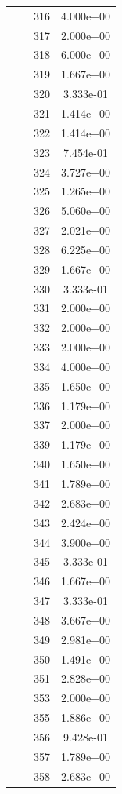 \documentclass[12pt]{article}
\begin{document}
\begin{longtable}{@{}cccc@{}}
 &  & 316 & 4.000e+00 \\
 &  & 317 & 2.000e+00 \\
 &  & 318 & 6.000e+00 \\
 &  & 319 & 1.667e+00 \\
 &  & 320 & 3.333e-01 \\
 &  & 321 & 1.414e+00 \\
 &  & 322 & 1.414e+00 \\
 &  & 323 & 7.454e-01 \\
 &  & 324 & 3.727e+00 \\
 &  & 325 & 1.265e+00 \\
 &  & 326 & 5.060e+00 \\
 &  & 327 & 2.021e+00 \\
 &  & 328 & 6.225e+00 \\
 &  & 329 & 1.667e+00 \\
 &  & 330 & 3.333e-01 \\
 &  & 331 & 2.000e+00 \\
 &  & 332 & 2.000e+00 \\
 &  & 333 & 2.000e+00 \\
 &  & 334 & 4.000e+00 \\
 &  & 335 & 1.650e+00 \\
 &  & 336 & 1.179e+00 \\
 &  & 337 & 2.000e+00 \\
 &  & 339 & 1.179e+00 \\
 &  & 340 & 1.650e+00 \\
 &  & 341 & 1.789e+00 \\
 &  & 342 & 2.683e+00 \\
 &  & 343 & 2.424e+00 \\
 &  & 344 & 3.900e+00 \\
 &  & 345 & 3.333e-01 \\
 &  & 346 & 1.667e+00 \\
 &  & 347 & 3.333e-01 \\
 &  & 348 & 3.667e+00 \\
 &  & 349 & 2.981e+00 \\
 &  & 350 & 1.491e+00 \\
 &  & 351 & 2.828e+00 \\
 &  & 353 & 2.000e+00 \\
 &  & 355 & 1.886e+00 \\
 &  & 356 & 9.428e-01 \\
 &  & 357 & 1.789e+00 \\
 &  & 358 & 2.683e+00 \\

\end{longtable}
\end{document}
